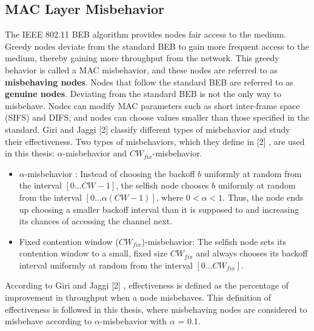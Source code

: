 \documentclass[12pt,letterpaper,english]{article}
\begin{document}
\subsection{MAC Layer Misbehavior}
\label{subsection:maclayermisbehavior}
\indent The IEEE 802.11 BEB algorithm provides nodes fair access to the medium. 
Greedy nodes deviate from the standard BEB to gain more frequent access to the medium, thereby gaining more throughput from the network. 
This greedy behavior is called a MAC misbehavior, and these nodes are referred to as \textbf{misbehaving nodes}. 
Nodes that follow the standard BEB are referred to as \textbf{genuine nodes}. 
Deviating from the standard BEB is not the only way to misbehave. Nodes can modify MAC parameters such as short inter-frame space (SIFS) and DIFS, and nodes can choose values smaller than those specified in the standard. 
Giri and Jaggi 
[2]
classify different types of misbehavior and study their effectiveness. 
Two types of misbehaviors, which they define in 
[2]
, are used in this thesis: $\alpha$-misbehavior and $CW_{fix}$-misbehavior.
\begin {itemize}
\item{{$\alpha$-misbehavior} :
Instead of choosing the backoff $b$ uniformly at random from the interval $[0 \ldots CW - 1]$, the selfish node chooses $b$ uniformly at random from the interval $[0 \ldots \alpha (CW - 1)]$, where $0 < \alpha < 1$.
Thus, the node ends up choosing a smaller backoff interval than it is supposed to and increasing its chances of accessing the channel next.
}
\item{ {Fixed contention window ($CW_{fix}$)-misbehavior}:
The selfish node sets its contention window to a small, fixed size $CW_{fix}$ and always chooses its backoff interval uniformly at random
from the interval $[0 \ldots CW_{fix}]$. 
}
\end{itemize}
According to Giri and Jaggi 
[2]
, effectiveness is defined as the percentage of improvement in throughput when a node misbehaves. This definition of effectiveness is followed in this thesis, where misbehaving nodes are considered to misbehave according to $\alpha$-misbehavior with $\alpha$ = 0.1.  
\end{document}
